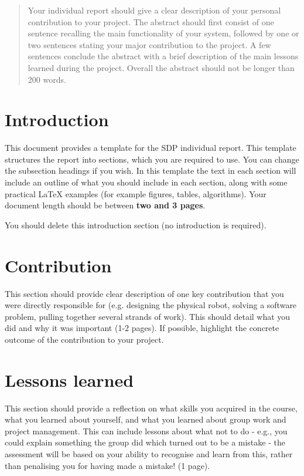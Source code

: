 \documentclass{article}
\begin{document}
 



\begin{abstract} 
Your individual report should give a clear description of your personal contribution to your project. 
The abstract should first consist of one sentence recalling the main functionality of your system, followed by one or two sentences
stating your major contribution to the project. A few sentences conclude the abstract with a brief description of the main lessons learned during the project. Overall the abstract should not be longer than 200 words.
\end{abstract} 

\section*{Introduction}
\label{sec:intro}
This document provides a template for the SDP individual report.  This template structures the report into sections, which you are required to use. You can change the subsection headings if you wish. In this template the text in each section will include an outline of what you should include in each section, along with some practical LaTeX examples (for example figures, tables, algorithms).  Your document length should be between \textbf{two and 3 pages}. 

You should delete this introduction section (no introduction is required).

\section{Contribution} 
This section should provide clear description of one key contribution that you were directly responsible for (e.g. designing the physical robot, solving a software problem, pulling together several strands of work). This should detail what you did and why it was important (1-2 pages). If possible,
highlight the concrete outcome of the contribution to your project.

\section{Lessons learned}
This section should provide a reflection on what skills you acquired in the course, what you learned about yourself, and what you learned about group work and project management. This can include lessons about what not to do - e.g., you could explain something the group did which turned out to be a mistake - the assessment will be based on your ability to recognise and learn from this, rather than penalising you for having made a mistake! (1 page).
\end{document}
